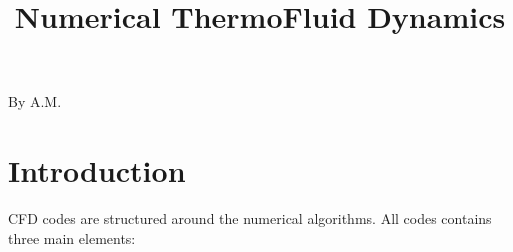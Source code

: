 \documentclass[a4paper, 15pt]{article}
\title{Numerical ThermoFluid Dynamics}
\author{}
\date{}
\begin{document}
\maketitle
{}
\setcounter{tocdepth}{5}  %
\begin{spacing}{0.95}
	\tableofcontents
\end{spacing} 
\vspace{0.5cm}
{\tiny By A.M.}
\newpage




\part{Introduction}
CFD codes are structured around the numerical algorithms. All codes contains three main elements: 
\end{document}
